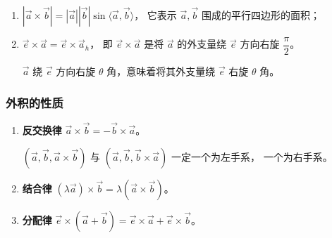 \documentclass[UTF8,11pt]{ctexart}
\theoremstyle{cnthm}
\begin{document}
\begin{enumerate}
\item $|\vec a\times\vec b|
=|\vec a||\vec b|\sin\langle\vec a,\vec b\rangle$，
它表示 $\vec a,\vec b$ 围成的平行四边形的面积；
\item $\vec e\times\vec a=\vec e\times\vec a_h$，
即 $\vec e\times\vec a$ 是将 $\vec a$ 的外支量绕 $\vec e$
方向右旋 $\dfrac\pi2$。

$\vec a$ 绕 $\vec e$ 方向右旋 $\theta$ 角，意味着将其外支量绕
$\vec e$ 右旋 $\theta$ 角。
\end{enumerate}

\subsubsection*{外积的性质}

\begin{enumerate}
\item \textbf{反交换律}\quad
$\vec a\times\vec b=-\vec b\times\vec a$。

$(\vec a,\vec b,\vec a\times\vec b)$ 与
$(\vec a,\vec b,\vec b\times\vec a)$ 一定一个为左手系，
一个为右手系。
\item \textbf{结合律}\quad
$(\lambda\vec a)\times\vec b=\lambda(\vec a\times\vec b)$。
\item \textbf{分配律}\quad
$\vec e\times(\vec a+\vec b)
=\vec e\times\vec a+\vec e\times\vec b$。
\end{enumerate}
\end{document}
